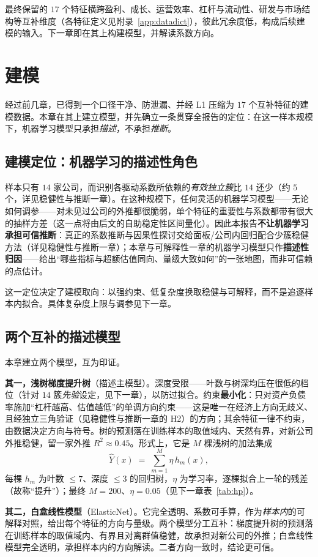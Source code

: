 \documentclass[UTF8, a4paper, fontset=none, zihao=-4]{ctexrep}
\begin{document}
最终保留的 $17$ 个特征横跨盈利、成长、运营效率、杠杆与流动性、研发与市场结构等互补维度（各特征定义见附录~\ref{app:datadict}），彼此冗余度低，构成后续建模的输入。下一章即在其上构建模型，并解读系数方向。

\chapter{建模}\label{ch:model}
经过前几章，已得到一个口径干净、防泄漏、并经 L1 压缩为 $17$ 个互补特征的建模数据。本章在其上建立模型，并先确立一条贯穿全报告的定位：在这一样本规模下，机器学习模型只承担\emph{描述}，不承担\emph{推断}。

\section{建模定位：机器学习的描述性角色}
样本只有 $14$ 家公司，而识别各驱动系数所依赖的\emph{有效独立簇}比 $14$ 还少（约 $5$ 个，详见稳健性与推断一章）。在这种规模下，任何灵活的机器学习模型——无论如何调参——对未见过公司的外推都很脆弱，单个特征的重要性与系数都带有很大的抽样方差（这一点将由后文的自助稳定性区间量化）。因此本报告\textbf{不让机器学习承担可信推断}：真正的系数推断与因果性探讨交给面板/公司内回归配合少簇稳健方法（详见稳健性与推断一章）；本章与可解释性一章的机器学习模型只作\textbf{描述性归因}——给出“哪些指标与超额估值同向、量级大致如何”的一张地图，而非可信赖的点估计。

这一定位决定了建模取向：以强约束、低复杂度换取稳健与可解释，而不是追逐样本内拟合。具体复杂度上限与调参见下一章。

\section{两个互补的描述模型}
本章建立两个模型，互为印证。

\textbf{其一，浅树梯度提升树}（描述主模型）。深度受限——叶数与树深均压在很低的档位（针对 $14$ 簇\emph{先验}设定，见下一章），以防过拟合。约束\textbf{最小化}：只对资产负债率施加“杠杆越高、估值越低”的单调方向约束——这是唯一在经济上方向无歧义、且经独立三角验证（见稳健性与推断一章的 H2）的方向；其余特征一律不约束，由数据决定方向与符号。树的预测落在训练样本的取值域内、天然有界，对新公司外推稳健，留一家外推 $R^2\approx0.45$。形式上，它是 $M$ 棵浅树的加法集成
\[
  \widehat{Y}(x)\;=\;\sum_{m=1}^{M}\eta\,h_m(x),
\]
每棵 $h_m$ 为叶数 $\leq 7$、深度 $\leq 3$ 的回归树，$\eta$ 为学习率，逐棵拟合上一轮的残差（故称“提升”）；最终 $M=200$、$\eta=0.05$（见下一章表~\ref{tab:hp}）。

\textbf{其二，白盒线性模型}（ElasticNet）。它完全透明、系数可手算，作为\emph{样本内}的可解释对照，给出每个特征的方向与量级。两个模型分工互补：梯度提升树的预测落在训练样本的取值域内、有界且对离群值稳健，故承担对新公司的外推；白盒线性模型完全透明，承担样本内的方向解读。二者方向一致时，结论更可信。
\end{document}
